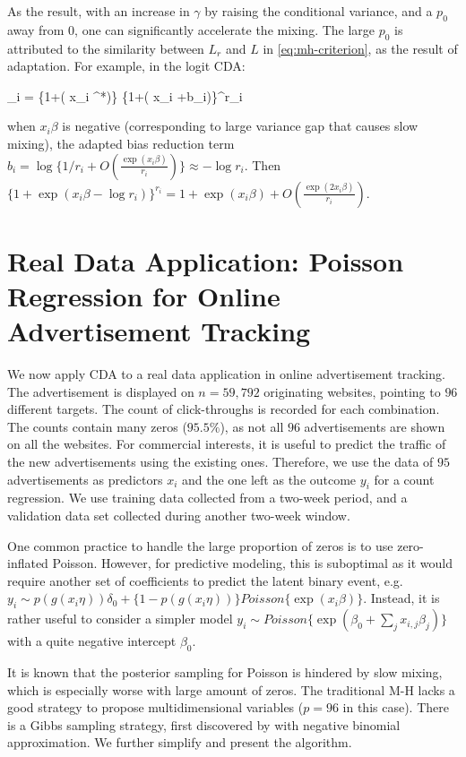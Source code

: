 \documentclass[10pt]{article}
\newcommand{\xbeta}{ x_i \beta}
\newcommand{\be}{\begin{equs}}
\newcommand{\ee}{\end{equs}}
\begin{document}
As the result, with an increase in $\gamma$ by raising the conditional variance, and a $p_0$ away from $0$, one can significantly accelerate the mixing. The large $p_0$ is attributed to the similarity between $L_r$ and $L$ in \eqref{eq:mh-criterion}, as the result of adaptation. For example, in the logit CDA:

\be
\alpha_i = \frac{ \{1+\exp(\xbeta)\}   \{1+\exp(\xbeta^*+b_i)\}^{r_i} } {  \{1+\exp(\xbeta^*)\}  \{1+\exp(\xbeta+b_i)\}^{r_i}    } 
\ee
when $\xbeta$ is negative (corresponding to large variance gap that causes slow mixing), the adapted bias reduction term $b_i  = \log\{ 1/r_{i} + O (\frac{\exp(\xbeta)}{r_i} )\} \approx -\log r_i$. Then $\{ 1+\exp(\xbeta-\log r_i)\}^{r_i} = 1+\exp(\xbeta) + O(\frac{\exp(2\xbeta) }{r_i})$.


\section{Real Data Application: Poisson Regression for Online Advertisement Tracking}

We now apply CDA to a real data application in online advertisement tracking. The advertisement is displayed on $n=59,792$ originating websites, pointing to $96$ different targets. The count of click-throughs is recorded for each combination. The counts contain many zeros ($95.5\%$), as not all $96$ advertisements are shown on all the websites. For commercial interests, it is useful  to predict the traffic of the new advertisements using the existing ones. Therefore, we use the data of $95$ advertisements as predictors $x_i$ and the one left as the outcome $y_i$ for a count regression. We use training data collected from a two-week period, and a validation data set collected during another two-week window. 

One common practice to handle the large proportion of zeros is to use zero-inflated Poisson. However, for predictive modeling, this is suboptimal as it would require another set of coefficients to predict the latent binary event, e.g. $y_i\sim p\left( g(x_i\eta)\right)  \delta_0+ \{ 1-p\left( g(x_i \eta) \right) \} Poisson\{\exp (x_i \beta)\}$. Instead, it is rather useful to consider a simpler model  $y_i\sim Poisson\{\exp(\beta_0+ \sum_j x_{i,j}\beta_j)\}$ with a quite negative intercept $\beta_0$.

It is known that the posterior sampling for Poisson is hindered by slow mixing, which is especially worse with large amount of zeros. The traditional M-H lacks a good strategy to propose multidimensional variables ($p=96$ in this case). There is a Gibbs sampling strategy, first discovered by \citep{zhou2012lognormal} with negative binomial approximation. We further simplify and present the algorithm.
\end{document}

